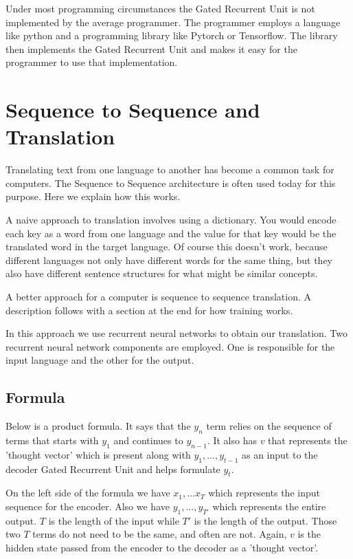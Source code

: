 Under most programming circumstances the Gated Recurrent Unit is not implemented by the average programmer. The programmer employs a language like python and a programming library like Pytorch or Tensorflow. The library then implements the Gated Recurrent Unit and makes it easy for the programmer to use that implementation.

\section{Sequence to Sequence and Translation}

Translating text from one language to another has become a common task for computers. The Sequence to Sequence architecture is often used today for this purpose. Here we explain how this works.

A naive approach to translation involves using a dictionary. You would encode each key as a word from one language and the value for that key would be the translated word in the target language. Of course this doesn't work, because different languages not only have different words for the same thing, but they also have different sentence structures for what might be similar concepts.

A better approach for a computer is sequence to sequence translation. A description follows with a section at the end for how training works.

In this approach we use recurrent neural networks to obtain our translation. Two recurrent neural network components are employed. One is responsible for the input language and the other for the output. 

\iffalse
\subsection{Formula}
Below is a product formula. It says that the $y_n$ term relies on the sequence of terms that starts with $y_1$ and continues to $y_{n-1}$. It also has $v$ that represents the 'thought vector' which is present along with $y_1,...,y_{t-1}$ as an input to the decoder Gated Recurrent Unit and helps formulate $y_t$.

On the left side of the formula we have $x_1,...x_T$ which represents the input sequence for the encoder. Also we have $y_1,...,y_{T'}$ which represents the entire output. $T$ is the length of the input while $T'$ is the length of the output. Those two $T$ terms do not need to be the same, and often are not. Again, $v$ is the hidden state passed from the encoder to the decoder as a 'thought vector'.

